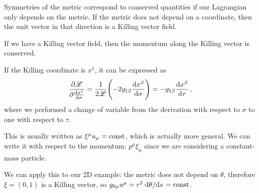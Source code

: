 \documentclass[main.tex]{subfiles}
\begin{document}
Symmetries of the metric correspond to conserved quantities if our Lagrangian only depends on the metric.
If the metric does not depend on a coordinate, then the unit vector in that direction is a Killing vector field. 

If we have a Killing vector field, then the momentum along the Killing vector is conserved.

If the Killing coordinate is \(x^{1}\), it can be expressed as 
%
\begin{align}
  \pdv{\mathscr L}{\dv{x^{1}}{\sigma }} = \frac{1}{2 \mathscr L} \qty(-2 g_{1 \beta } \dv{x^{\beta }}{\sigma }) = - g_{1 \beta } \dv{x^{\beta }}{\tau }
\,,
\end{align}
%
where we performed a change of variable from the derivation with respect to \(\sigma \) to one with respect to \(\tau \).

This is usually written as \(\xi^{\mu } u_{\mu } = \text{const}\), which is actually more general.
We can write it with respect to the momentum: \(p^{\mu } \xi_{\mu }\) since we are considering a constant-mass particle.

We can apply this to our 2D example: the metric does not depend on \(\theta \), therefore \(\xi = (0,1)\) is a Killing vector, so \(g_{\theta \mu  } u^{\mu } = r^2 \dv*{\theta }{s} = \text{const}\).
\end{document}
